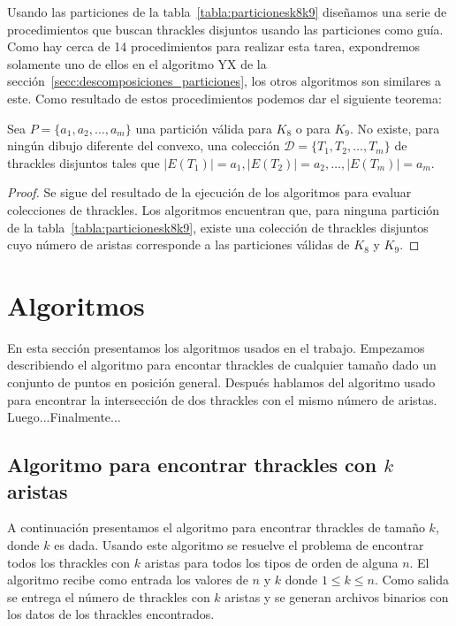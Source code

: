     Usando las particiones de la tabla~\ref{tabla:particionesk8k9} diseñamos
    una serie de procedimientos que buscan thrackles disjuntos usando las particiones como guía.
    Como hay cerca de 14 procedimientos para realizar esta tarea, expondremos solamente
    uno de ellos en el algoritmo YX de la sección~\ref{secc:descomposiciones_particiones}, los
    otros algoritmos son similares a este. Como resultado de estos procedimientos podemos dar el
    siguiente teorema:
    \begin{theorem}
      Sea $P=\{a_1,a_2,\dots,a_m\}$ una partición válida para $K_8$ o para $K_9$. No existe, para
      ningún dibujo diferente del convexo, una colección $\mathcal{D}=\{T_1,T_2,\dots,T_m\}$ de
      thrackles disjuntos tales que $|E(T_1)|=a_1,|E(T_2)|=a_2,\dots,|E(T_m)|=a_m$.
    \end{theorem}
    \begin{proof}
      Se sigue del resultado de la ejecución de los algoritmos para evaluar colecciones de
      thrackles. Los algoritmos encuentran que, para ninguna partición de la
      tabla~\ref{tabla:particionesk8k9}, existe una colección de thrackles disjuntos cuyo número de
      aristas corresponde a las particiones válidas de $K_8$ y $K_9$.
    \end{proof}

\section{Algoritmos}\label{seccion_algoritmos}
En esta sección presentamos los algoritmos usados en el trabajo. Empezamos
describiendo el algoritmo para encontar thrackles de cualquier tamaño dado
un conjunto de puntos en posición general. Después hablamos del algoritmo
usado para encontrar la intersección de dos thrackles con el mismo número de
aristas. Luego...Finalmente...


\subsection{Algoritmo para encontrar thrackles con $k$
  aristas}\label{seccion_algoritmo_kthrackles}
  A continuación presentamos el algoritmo para encontrar thrackles de tamaño
  $k$, donde $k$ es dada. Usando este algoritmo se resuelve el problema de
  encontrar todos los thrackles con $k$ aristas para todos los tipos de orden
  de alguna $n$. El algoritmo recibe como entrada los valores de $n$ y $k$
  donde $1 \leq k \leq n$. Como salida se entrega el número de thrackles con
  $k$ aristas y se generan archivos binarios con los datos de los thrackles
  encontrados.

